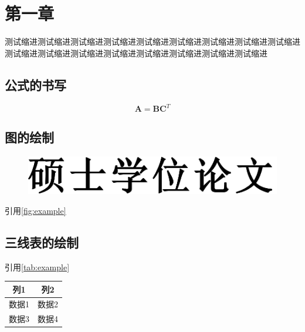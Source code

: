\chapter{第一章}

测试缩进测试缩进测试缩进测试缩进测试缩进测试缩进测试缩进测试缩进测试缩进测试缩进测试缩进测试缩进测试缩进测试缩进测试缩进测试缩进测试缩进

\section{公式的书写}

\begin{equation}
\label{eq-1}
    \mathbf{A} = \mathbf{B} \mathbf{C}^T
\end{equation}

\section{图的绘制}

\begin{figure}
    \vspace{1em}
    \centering
    \includegraphics[width=0.7\linewidth]{figures/master-hwzs.pdf}
    \label{fig:example}
\end{figure}

引用\autoref{fig:example}

\section{三线表的绘制}

引用\autoref{tab:example}

\begin{table}[h]
    \label{tab:example}
    \centering
    \vspace{-0.2cm}
    \wuhao\yingsong
    \begin{tabular}{cc}
        \hline
        列1 & 列2  \\
        \hline
        数据1 & 数据2 \\
        数据3 & 数据4 \\
        \hline
    \end{tabular}
\end{table}

